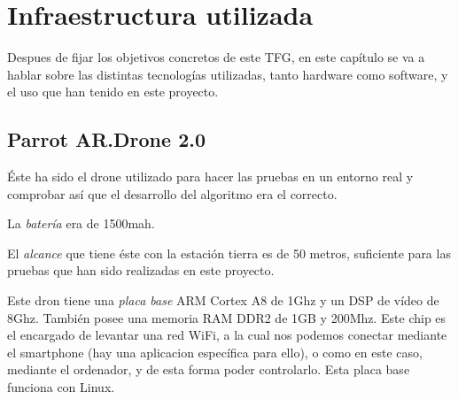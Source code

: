 \chapter{Infraestructura utilizada}\label{cap.infraestructura}
\hspace{1 cm} Despues de fijar los objetivos concretos de este TFG, en este cap\'itulo se va a hablar sobre las distintas tecnolog\'ias utilizadas, tanto hardware como software, y el uso que han tenido en este proyecto. 

\section{Parrot AR.Drone 2.0 }
\hspace{1 cm} \'Este ha sido el drone utilizado para hacer las pruebas en un entorno real y comprobar as\'i que el desarrollo del algoritmo era el correcto. 

\hspace{1 cm} La \textsl{bater\'ia} era de 1500mah. %

\hspace{1 cm} El \textsl{alcance} que tiene \'este con la estaci\'on tierra es de 50 metros, suficiente para las pruebas que han sido realizadas en este proyecto. 

\hspace{1 cm} Este dron tiene una \textsl{placa base} ARM Cortex A8 de 1Ghz y un DSP de v\'ideo de 8Ghz. Tambi\'en posee una memoria RAM DDR2 de 1GB y 200Mhz. Este chip es el encargado de levantar una red WiFi, a la cual nos podemos conectar mediante el smartphone (hay una aplicacion espec\'ifica para ello), o como en este caso, mediante el ordenador, y de esta forma poder controlarlo. Esta placa base funciona con Linux. 

